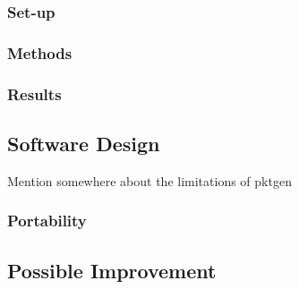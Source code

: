 \documentclass[final_report.tex]{subfiles}
\begin{document}
\subsubsection{Set-up}

\subsubsection{Methods}

\subsubsection{Results}

\subsection{Software Design}
Mention somewhere about the limitations of pktgen

\subsubsection{Portability}

\subsection{Possible Improvement}
\end{document}
